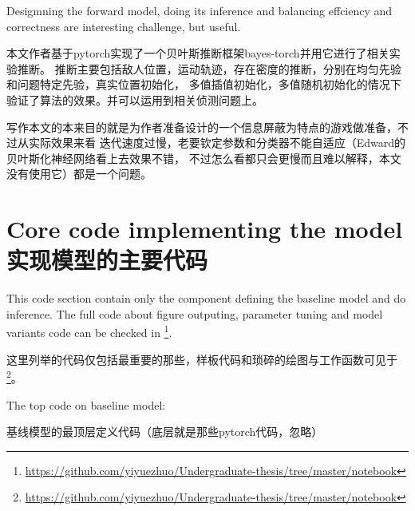 \documentclass{article}
\begin{document}
Desigmning the forward model, doing its inference and balancing effciency and correctness 
are interesting challenge, but useful.

本文作者基于pytorch实现了一个贝叶斯推断框架bayes-torch并用它进行了相关实验推断。
推断主要包括敌人位置，运动轨迹，存在密度的推断，分别在均匀先验和问题特定先验，真实位置初始化，
多值插值初始化，多值随机初始化的情况下验证了算法的效果。并可以运用到相关侦测问题上。

写作本文的本来目的就是为作者准备设计的一个信息屏蔽为特点的游戏做准备，不过从实际效果来看
迭代速度过慢，老要钦定参数和分类器不能自适应（Edward的贝叶斯化神经网络看上去效果不错，
不过怎么看都只会更慢而且难以解释，本文没有使用它）都是一个问题。

\section{Core code implementing the model 实现模型的主要代码}

This code section contain only the component defining the baseline model and do inference. 
The full code about figure outputing, parameter tuning and model variants code can be checked in 
\footnote{\url{https://github.com/yiyuezhuo/Undergraduate-thesis/tree/master/notebook}}.

这里列举的代码仅包括最重要的那些，样板代码和琐碎的绘图与工作函数可见于
\footnote{\url{https://github.com/yiyuezhuo/Undergraduate-thesis/tree/master/notebook}}。


The top code on baseline model:

基线模型的最顶层定义代码（底层就是那些pytorch代码，忽略）
\end{document}
